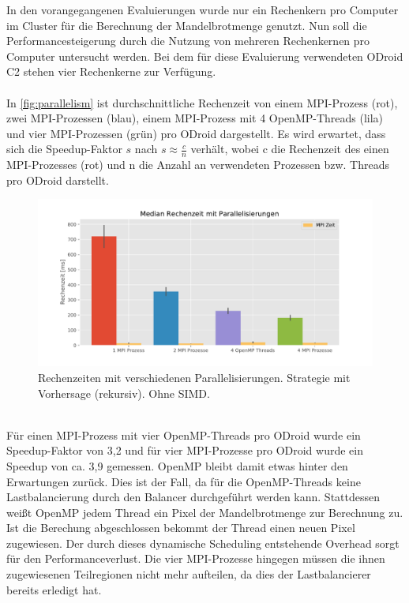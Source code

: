 In den vorangegangenen Evaluierungen wurde nur ein Rechenkern pro Computer im Cluster für die Berechnung der Mandelbrotmenge genutzt. Nun soll die Performancesteigerung durch die Nutzung von mehreren Rechenkernen pro Computer untersucht werden. Bei dem für diese Evaluierung verwendeten ODroid C2 stehen vier Rechenkerne zur Verfügung.
\\
\\
In \autoref{fig:parallelism} ist durchschnittliche Rechenzeit von einem MPI-Prozess (rot), zwei MPI-Prozessen (blau), einem MPI-Prozess mit 4 OpenMP-Threads (lila) und vier MPI-Prozessen (grün) pro ODroid dargestellt. Es wird erwartet, dass sich die Speedup-Faktor \( s \) nach \( s \approx \frac{c}{n} \) verhält, wobei c die Rechenzeit des einen MPI-Prozesses (rot) und n die Anzahl an verwendeten Prozessen bzw. Threads pro ODroid darstellt.
\\
\begin{figure}[h!]
	\centering
	\includegraphics[width=0.9\linewidth]{img/Evaluation/parallelism.pdf}
	\caption{Rechenzeiten mit verschiedenen Parallelisierungen. Strategie mit Vorhersage (rekursiv). Ohne SIMD.}
	\label{fig:parallelism}
\end{figure}
\\
Für einen MPI-Prozess mit vier OpenMP-Threads pro ODroid wurde ein Speedup-Faktor von 3,2 und für vier MPI-Prozesse pro ODroid wurde ein Speedup von ca. 3,9 gemessen. OpenMP bleibt damit etwas hinter den Erwartungen zurück. Dies ist der Fall, da für die OpenMP-Threads keine Lastbalancierung durch den Balancer durchgeführt werden kann. Stattdessen weißt OpenMP jedem Thread ein Pixel der Mandelbrotmenge zur Berechnung zu. Ist die Berechung abgeschlossen bekommt der Thread einen neuen Pixel zugewiesen. Der durch dieses dynamische Scheduling entstehende Overhead sorgt für den Performanceverlust. Die vier MPI-Prozesse hingegen müssen die ihnen zugewiesenen Teilregionen nicht mehr aufteilen, da dies der Lastbalancierer bereits erledigt hat.


